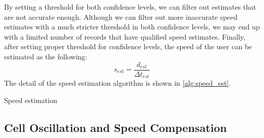 By setting a threshold for both confidence levels, we can filter out estimates that are not accurate enough. Although we can filter out more inaccurate speed estimates with a much stricter threshold in both confidence levels, we may end up with a limited number of records that have qualified speed estimates. Finally, after setting proper threshold for confidence levels, the speed of the user can be estimated as the following:
\begin{equation}
  s_{est} = \frac{d_{est}}{\Delta t_{est}}
\end{equation}
The detail of the speed estimation algorithm is shown in \autoref{alg:speed_est}.


\begin{algorithm}
 \caption{Speed estimation}\label{alg:speed_est}
\end{algorithm}


\subsection{Cell Oscillation and Speed Compensation}

